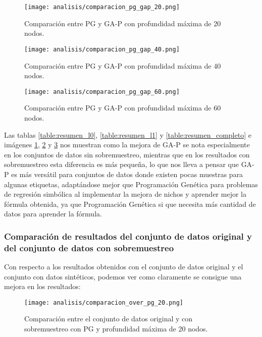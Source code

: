 \begin{figure}[H]
    \centering
	  \texttt{[image: analisis/comparacion\_pg\_gap\_20.png]}
	  \caption{Comparación entre PG y GA-P con profundidad máxima de 20 nodos.}\label{fig:cmp_pg_gap_20}

\end{figure}

\begin{figure}[H]
    \centering
	  \texttt{[image: analisis/comparacion\_pg\_gap\_40.png]}
	  \caption{Comparación entre PG y GA-P con profundidad máxima de 40 nodos.}\label{fig:cmp_pg_gap_40}

\end{figure}

\begin{figure}[H]
    \centering
	  \texttt{[image: analisis/comparacion\_pg\_gap\_60.png]}
	  \caption{Comparación entre PG y GA-P con profundidad máxima de 60 nodos.}\label{fig:cmp_pg_gap_60}
\end{figure}



Las tablas \ref{table:resumen_l0}, \ref{table:resumen_l1} y \ref{table:resumen_completo} e imágenes \ref{fig:cmp_pg_gap_20}, \ref{fig:cmp_pg_gap_40} y \ref{fig:cmp_pg_gap_60} nos muestran como la mejora de GA-P se nota especialmente en los conjuntos de datos sin sobremuestreo, mientras que en los resultados con sobremuestreo esta diferencia es más pequeña, lo que nos lleva a pensar que GA-P es más versátil para conjuntos de datos donde existen pocas muestras para algunas etiquetas, adaptándose mejor que Programación Genética para problemas de regresión simbólica al implementar la mejora de nichos y aprender mejor la fórmula obtenida, ya que Programación Genética si que necesita más cantidad de datos para aprender la fórmula.

\subsubsection{Comparación de resultados del conjunto de datos original y del conjunto de datos con sobremuestreo}

Con respecto a los resultados obtenidos con el conjunto de datos original y el conjunto con datos sintéticos, podemos ver como claramente se consigue una mejora en los resultados:


\begin{figure}[H]
    \centering
	  \texttt{[image: analisis/comparacion\_over\_pg\_20.png]}
	  \caption{Comparación entre el conjunto de datos original y con sobremuestreo con PG y profundidad máxima de 20 nodos.}\label{fig:cmp_pg_over_20}

\end{figure}

